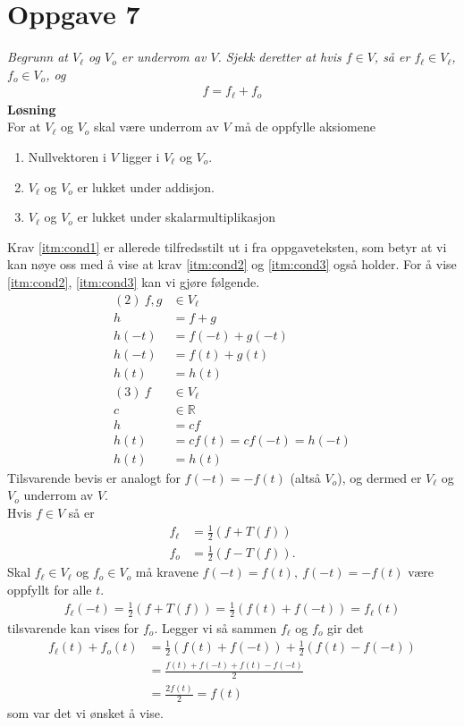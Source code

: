 \documentclass[12pt,
               a4paper,
               article,
               oneside,
               oldfontcommands,
               norsk]{memoir}
\begin{document}
\section*{Oppgave 7}
\emph{Begrunn at $V_\ell$ og $V_o$ er underrom av $V$. Sjekk deretter at hvis $f \in V$, så er $f_\ell \in V_\ell$, $f_o \in V_{o}$, og}
\begin{align*}
f = f_\ell + f_o
\end{align*}
\textbf{Løsning}\vspace{3mm}\\
For at $V_\ell$ og $V_o$ skal være underrom av $V$ må de oppfylle aksiomene
\begin{enumerate}
\item \label{itm:cond1}Nullvektoren i $V$ ligger i $V_\ell$ og $V_o$.
\item  \label{itm:cond2} $V_\ell$ og $V_o$ er lukket under addisjon.
 \item \label{itm:cond3} $V_\ell$ og $V_o$ er lukket under skalarmultiplikasjon
\end{enumerate}
Krav \ref{itm:cond1} er allerede tilfredsstilt ut i fra oppgaveteksten, som betyr at vi kan nøye oss med å vise at krav \ref{itm:cond2} og \ref{itm:cond3} også holder. For å vise \ref{itm:cond2}, \ref{itm:cond3} kan vi gjøre følgende.
\begin{align*}
(2) \ f, g &\in V_\ell \\[5pt]
h &= f + g \\[5pt]
h(-t) &= f(-t) + g(-t) \\[5pt]
h(-t) &= f(t) + g(t) \\[5pt]
h(t) &= h(t)\\[15pt]
(3) \ f &\in V_\ell \\[5pt]
	c &\in \mathbb{R}\\[5pt]
	h &= cf \\[5pt]
	h(t) &= cf(t) = cf(-t) = h(-t) \\[5pt]
	h(t) &= h(t)
\end{align*}
Tilsvarende bevis er analogt for $f(-t) = -f(t)$ (altså $V_o$), og dermed er $V_\ell$ og $V_o$ underrom av $V$. \vspace{3mm}\\
Hvis $f \in V$ så er 
\begin{align*}
f_\ell &= \frac{1}{2}\left(f + T(f) \right)\\[8pt]
f_o &= \frac{1}{2}\left(f - T(f) \right).
\end{align*}
Skal $f_\ell \in V_\ell$ og $f_o \in V_o$ må kravene $f(-t) = f(t), \ f(-t) = -f(t)$ være oppfyllt for alle $t$.
\begin{align*}
f_\ell(-t) = \frac{1}{2}\left(f + T(f) \right) =  \frac{1}{2}\left(f(t) + f(-t) \right) = f_\ell(t)
\end{align*}
tilsvarende kan vises for $f_o$. Legger vi så sammen $f_\ell$ og $f_o$ gir det 
\begin{align*}
f_\ell(t) + f_o(t) &= 
	\frac{1}{2}\left(f(t) + f(-t) \right) + \frac{1}{2}\left(f(t) - f(-t) 				\right)\\[5pt]
&=
	\frac{f(t) + f(-t) + f(t) - f(-t)}{2}\\[5pt]
&=
	\frac{2f(t)}{2} = f(t)	
\end{align*}
som var det vi ønsket å vise.
\end{document}
